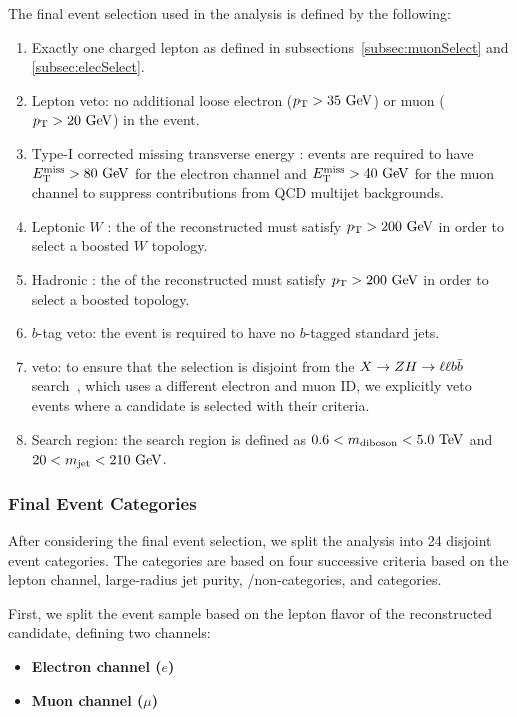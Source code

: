 The final event selection used in the analysis is defined by the following:
\begin{enumerate}
  \item Exactly one charged lepton as defined in subsections~\ref{subsec:muonSelect} and \ref{subsec:elecSelect}.
  \item Lepton veto: no additional loose electron ($\pt>35\unit{GeV}$) or muon ($\pt>20\unit{GeV}$) in the event.
  \item Type-I corrected missing transverse energy \EtmissTI: events are required to have $\Etmiss>80\unit{GeV}$ for the electron channel and $\Etmiss>40\unit{GeV}$ for the muon channel to suppress contributions from QCD multijet backgrounds.
  \item Leptonic $W$ \pt: the \pt of the reconstructed \Wlep must satisfy $\pt>200\unit{GeV}$ in order to select a boosted $W$ topology.
  \item Hadronic \VorH \pt: the \pt of the reconstructed \Vhad must satisfy $\pt>200\unit{GeV}$ in order to select a boosted \VorH topology.
  \item $b$-tag veto: the event is required to have no $b$-tagged standard jets.
  \item \ZH veto: to ensure that the selection is disjoint from the $X\to\ZH\to\ell\ell\bbbar$ search~\cite{CMS_AN2019_107}, which uses a different electron and muon ID, we explicitly veto events where a \ZH candidate is selected with their criteria.
  \item Search region: the search region is defined as $0.6<\MVV<5.0\unit{TeV}$ and $20<\MJ<210\unit{GeV}$.
\end{enumerate}

\subsubsection{Final Event Categories}
\label{subsec:eventCat}

After considering the final event selection, we split the analysis into 24 disjoint event categories.
The categories are based on four successive criteria based on the lepton channel, large-radius jet purity, \VBF/non-\VBF categories, and \Dy categories.

First, we split the event sample based on the lepton flavor of the reconstructed \Wlep candidate, defining two channels:
\begin{itemize}
  \item {\bfseries Electron channel ($e$)}
  \item {\bfseries Muon channel ($\mu$)}
\end{itemize}


